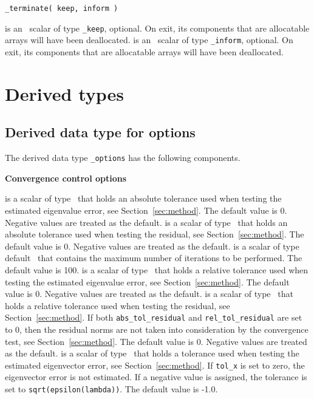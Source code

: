 \medskip

\hspace{8mm} {\tt \solver\_terminate( keep, inform )}

\begin{description}
%
 is an \intentinout\ scalar of type 
{\tt \solver\_keep}, optional. 
On exit, its components that are allocatable arrays will have been deallocated. 
%
 is an \intentinout\ scalar of type {\tt \solver\_inform}, 
optional.
On exit, its components that are allocatable arrays will have been deallocated. 
%
\end{description}

\section{Derived types}

\subsection{Derived data type for options}

\label{sec:options}

The derived data type
{\tt \solver\_options}
has the following components.

\bigskip
\noindent
{\bf Convergence control options}

\begin{description}
%
 is a scalar of type %
\REALDP\ that
holds an absolute tolerance used when testing the estimated eigenvalue 
error, see Section~\ref{sec:method}. 
The default value is 0. %
Negative values are treated as the default.
%
 is a scalar of type \REALDP\ that
holds an absolute tolerance used when testing the residual, 
see Section~\ref{sec:method}.
The default value is 0.
Negative values are treated as the default.
%
 is a scalar of type default \Integer\ that
contains the maximum number of iterations to be performed.
The default value is 100. %
%
 is a scalar of type \REALDP\ that
holds a relative tolerance used when testing the estimated eigenvalue 
error, see Section~\ref{sec:method}. 
The default value is 0. 
Negative values are treated as the default.
%
 is a scalar of type \REALDP\ that
holds a relative tolerance used when testing the residual,
see Section~\ref{sec:method}. 
If both {\tt abs\_tol\_residual} and {\tt rel\_tol\_residual}
are set to 0, then the residual norms are not taken
into consideration by the convergence test,
see Section~\ref{sec:method}.
The default value is 0.
Negative values are treated as the default.
%
 is a scalar of type \REALDP\ 
that holds a tolerance used when testing the estimated 
eigenvector error, see Section~\ref{sec:method}. 
If {\tt tol\_x} is set to zero, the eigenvector error is not estimated.
If a negative value is assigned, the tolerance is set to
{\tt sqrt(epsilon(lambda))}.
The default value is -1.0.
%
\end{description}

